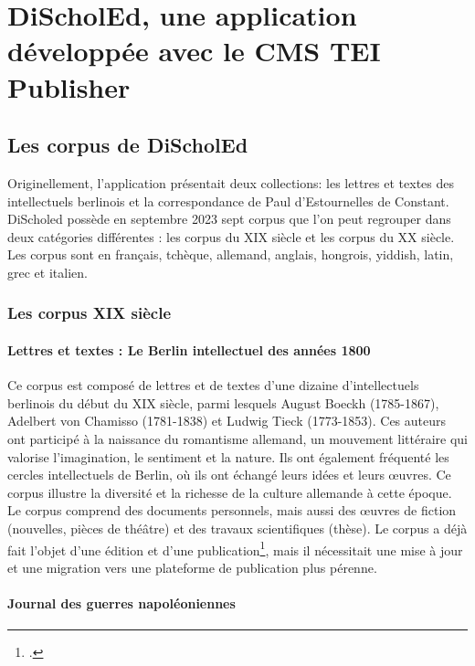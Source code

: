 \part{DiScholEd, une application développée avec le CMS TEI Publisher}

\chapter{Les corpus de DiScholEd }

Originellement, l'application présentait deux collections: les lettres et textes des intellectuels berlinois et la correspondance de Paul d’Estournelles de Constant. DiScholed possède en septembre 2023 sept corpus que l'on peut regrouper dans deux catégories différentes : les corpus du XIX siècle et les corpus du XX siècle. Les corpus sont en français, tchèque, allemand, anglais, hongrois, yiddish, latin, grec et italien.

\section{Les corpus XIX siècle}

\subsection{Lettres et textes : Le Berlin intellectuel des années 1800}

Ce corpus est composé de lettres et de textes d’une dizaine d’intellectuels berlinois du début du XIX siècle, parmi lesquels August Boeckh (1785-1867), Adelbert von Chamisso (1781-1838) et Ludwig Tieck (1773-1853). Ces auteurs ont participé à la naissance du romantisme allemand, un mouvement littéraire qui valorise l’imagination, le sentiment et la nature. Ils ont également fréquenté les cercles intellectuels de Berlin, où ils ont échangé leurs idées et leurs œuvres. Ce corpus illustre la diversité et la richesse de la culture allemande à cette époque. Le corpus comprend des documents personnels, mais aussi des œuvres de fiction (nouvelles, pièces de théâtre) et des travaux scientifiques (thèse). Le corpus a déjà fait l’objet d’une édition et d’une publication\footcite{DiScholEdBerlinintellectualsCorrespondences}, mais il nécessitait une mise à jour et une migration vers une plateforme de publication plus pérenne.

\subsection{Journal des guerres napoléoniennes}

